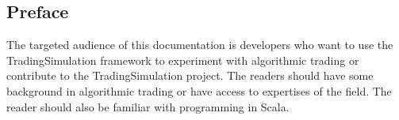 \subsection*{Preface}

The targeted audience of this documentation is developers who want to use the TradingSimulation framework to experiment with algorithmic trading or contribute to the TradingSimulation project. The readers should have some background in algorithmic trading or have access to expertises of the field. The reader should also be familiar with programming in Scala.
